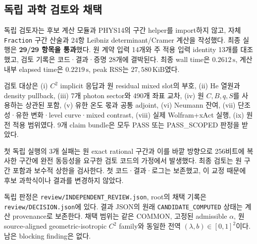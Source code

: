 \subsection{독립 과학 검토와 채택}
독립 검토자는 후보 계산 모듈과 PHYS14의 구간 helper를 import하지 않고, 자체 \texttt{Fraction} 구간 산술과 24항 Leibniz determinant/Cramer 계산을 작성했다. 최종 실행은 \textbf{29/29 항목을 통과}했다. 원 계약 입력 14개와 주 적용 입력 identity 13개를 대조했고, 검토 기록은 코드·결과·증명 28개에 결박된다. 최종 wall time은 \(0.2612\,\mathrm{s}\), 계산 내부 elapsed time은 \(0.2219\,\mathrm{s}\), peak RSS는 \(27{,}580\,\mathrm{KiB}\)였다.

검토 대상은 (i) \(C^2\) implicit 응답과 원 residual mixed slot의 부호, (ii) He 열원과 density pullback, (iii) 7개 photon sector와 490개 좌표 교차, (iv) 원 \(C,B,q,S\)를 사용하는 상관된 포함, (v) 유한 온도 몫과 공통 adjoint, (vi) Neumann 잔여, (vii) 단조성·유한 변화·level curve·mixed contrast, (viii) 실제 Wolfram+xAct 실행, (ix) 원전 적용 범위였다. 9개 claim bundle은 모두 PASS 또는 PASS\_SCOPED 판정을 받았다.

첫 독립 실행의 3개 실패는 원 exact rational 구간과 이를 바깥 방향으로 256비트에 복사한 구간에 완전 동등성을 요구한 검토 코드의 가정에서 발생했다. 최종 검토는 원 구간 포함과 보수적 상한을 검사한다. 첫 코드·결과·로그는 보존했고, 이 교정 때문에 후보 과학식이나 결과를 변경하지 않았다.

독립 판정은 \texttt{review/INDEPENDENT\_REVIEW.json}, root의 채택 기록은 \texttt{review/DECISION.json}에 있다. 결과 JSON의 원래 \texttt{CANDIDATE\_COMPUTED} 상태는 계산 provenance로 보존한다. 채택 범위는 같은 COMMON, 고정된 admissible \(\alpha\), 원 source-aligned geometric-isotropic \(C^2\) family와 동일한 전역 \((\lambda,b)\in[0,1]^2\)이다. 남은 blocking finding은 없다.
